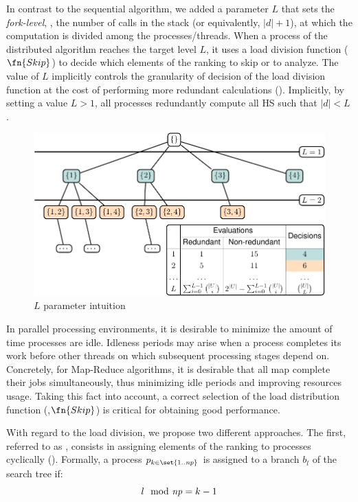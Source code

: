 In contrast to the sequential algorithm, we added a parameter $L$ that
sets the \textit{fork-level}, \ie, the number of calls in the stack
(or equivalently, $|d| + 1$), at which the computation is divided
among the processes/threads.
%
When a process of the distributed algorithm reaches the target level
$L$, it uses a load division function ($\fn{Skip}$) to decide which
elements of the ranking to skip or to analyze.
%
The value of $L$ implicitly controls the granularity of decision of
the load division function at the cost of performing more redundant
calculations ().
%
Implicitly, by setting a value $L > 1$, all processes redundantly
compute all \ac{HS} such that $|d| < L$.
\begin{figure}[ht!]
  \includegraphics[page=1]{figures/mhs2/figures/parallel/main}
  \caption{$L$ parameter intuition\label{fig:mhs2p:L-param}}
\end{figure}

In parallel processing environments, it is desirable to minimize the amount of time processes are idle.
%
Idleness periods may arise when a process completes its work before
other threads on which subsequent processing stages depend on.
%
Concretely, for Map-Reduce algorithms, it is desirable that all map
complete their jobs simultaneously, thus minimizing idle periods and
improving resources usage.
%
Taking this fact into account, a correct selection of the load
distribution function (\ie,$\fn{Skip}$) is critical for obtaining good
performance.
%

With regard to the load division, we propose two different approaches.
%
The first, referred to as \strideFn{}, consists in assigning elements
of the ranking to processes cyclically
().
%
Formally, a process $p_{k \in\set{1..\nproc}}$ is assigned to a branch
$b_l$ of the search tree if:
\begin{equation}
  l \mod{\mathit{np}} = k - 1
\end{equation}
%

